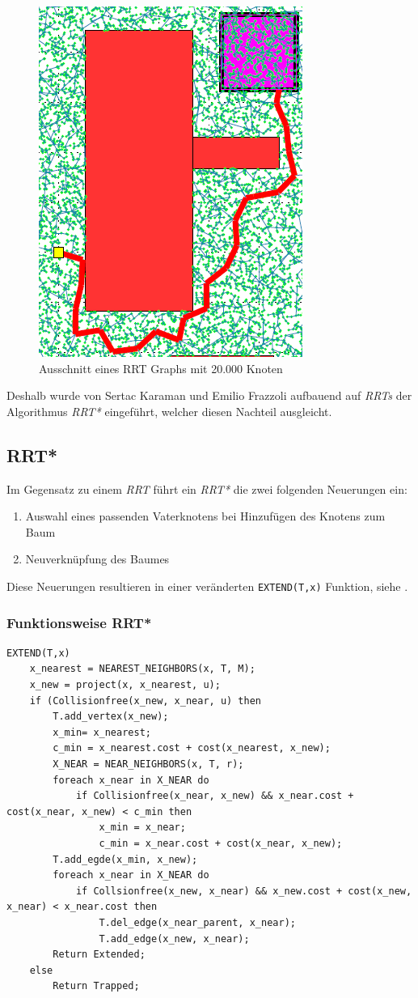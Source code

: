 \begin{figure}
\includegraphics[scale=1]{Bilder/rrt_path.png} 
\caption{Ausschnitt eines RRT Graphs mit 20.000 Knoten \citep{KaFra10} }
\end{figure}
Deshalb wurde von Sertac Karaman und Emilio Frazzoli aufbauend auf \textit{RRTs} der Algorithmus\textit{ RRT*} eingeführt, welcher diesen Nachteil ausgleicht.
\subsection{RRT*}
\label{RRT*}
Im Gegensatz zu einem \textit{RRT} führt ein \textit{RRT*} die zwei folgenden Neuerungen ein:
\begin{enumerate}
\item Auswahl eines passenden Vaterknotens bei Hinzufügen des Knotens zum Baum
\item Neuverknüpfung des Baumes
\end{enumerate}

Diese Neuerungen resultieren in einer veränderten \verb|EXTEND(T,x)| Funktion, siehe \citep{KaFra10}.
\subsubsection{Funktionsweise RRT*}
\begin{lstlisting}
EXTEND(T,x)
	x_nearest = NEAREST_NEIGHBORS(x, T, M);
	x_new = project(x, x_nearest, u);
	if (Collisionfree(x_new, x_near, u) then
		T.add_vertex(x_new);
		x_min= x_nearest;
		c_min = x_nearest.cost + cost(x_nearest, x_new);
		X_NEAR = NEAR_NEIGHBORS(x, T, r);
		foreach x_near in X_NEAR do
			if Collisionfree(x_near, x_new) && x_near.cost + cost(x_near, x_new) < c_min then
				x_min = x_near;
				c_min = x_near.cost + cost(x_near, x_new);
		T.add_egde(x_min, x_new);
		foreach x_near in X_NEAR do
			if Collsionfree(x_new, x_near) && x_new.cost + cost(x_new, x_near) < x_near.cost then
				T.del_edge(x_near_parent, x_near);
				T.add_edge(x_new, x_near);
		Return Extended;
	else
		Return Trapped;
\end{lstlisting}

